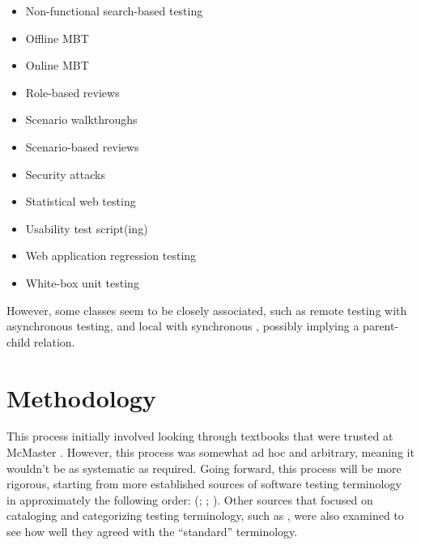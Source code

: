 \begin{itemize}
            \citealp[p.~356]{SakamotoEtAl2013})
      \item Non-functional search-based testing \citep[Tab.~1]{DoğanEtAl2014}
      \item Offline MBT \citepISTQB{}
      \item Online MBT \citepISTQB{}
      \item Role-based reviews \citepISTQB{}
      \item Scenario walkthroughs \citep[Fig.~4]{Gerrard2000a}
      \item Scenario-based reviews \citepISTQB{}
      \item Security attacks \citepISTQB{}
      \item Statistical web testing \citep[p.~185]{DoğanEtAl2014}
      \item Usability test script(ing) \citepISTQB{}
      \item Web application regression testing \cite[Tab.~21]{DoğanEtAl2014}
      \item White-box unit testing \citep[pp.~345-346]{SakamotoEtAl2013}
\end{itemize}

However, some classes seem to be closely associated, such as remote testing
with asynchronous testing, and local with synchronous \citep{JardEtAl1999},
possibly implying a parent-child relation.

\section{Methodology}

This process initially involved looking through textbooks that were trusted at
McMaster \citep{Patton2006, PetersAndPedrycz2000, vanVliet2000}. However, this
process was somewhat ad hoc and arbitrary, meaning it wouldn't be as systematic
as required. Going forward, this process will be more rigorous, starting from
more established sources of software testing terminology in approximately the
following order:
(\citealp{IEEE2022, SWEBOK2024, SWEBOK2014, IEEE2017, IEEE2013, ISO_IEC2023b,
      IEEE2012, ISO_IEC2023a}; \citealpISTQB{}; \citealp{Firesmith2015, IEEE2021}).
Other sources that focused on cataloging and categorizing testing terminology,
such as \citet{KuļešovsEtAl2013}, were also examined to see how well they
agreed with the ``standard'' terminology.

